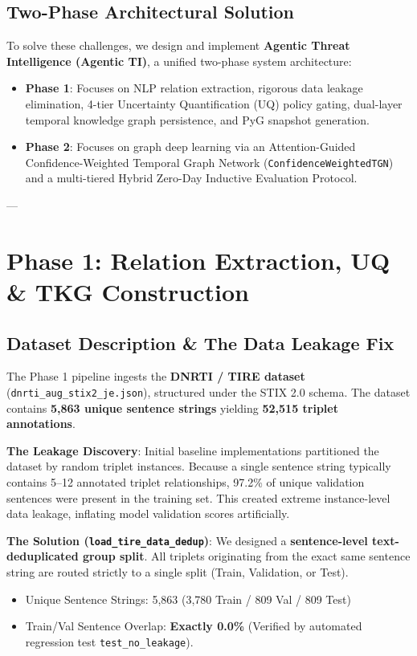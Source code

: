 \documentclass[11pt,a4paper]{article}
\begin{document}
\subsection{Two-Phase Architectural Solution}
To solve these challenges, we design and implement \textbf{Agentic Threat Intelligence (Agentic TI)}, a unified two-phase system architecture:
\begin{itemize}
    \item \textbf{Phase 1}: Focuses on NLP relation extraction, rigorous data leakage elimination, 4-tier Uncertainty Quantification (UQ) policy gating, dual-layer temporal knowledge graph persistence, and PyG snapshot generation.
    \item \textbf{Phase 2}: Focuses on graph deep learning via an Attention-Guided Confidence-Weighted Temporal Graph Network (\texttt{ConfidenceWeightedTGN}) and a multi-tiered Hybrid Zero-Day Inductive Evaluation Protocol.
\end{itemize}

---

\section{Phase 1: Relation Extraction, UQ \& TKG Construction}

\subsection{Dataset Description \& The Data Leakage Fix}
The Phase 1 pipeline ingests the \textbf{DNRTI / TIRE dataset} (\texttt{dnrti\_aug\_stix2\_je.json}), structured under the STIX 2.0 schema. The dataset contains \textbf{5,863 unique sentence strings} yielding \textbf{52,515 triplet annotations}.

\begin{tcolorbox}[colframe=accent, title=Critical Scientific Breakthrough: 97.2\% Data Leakage Elimination]
\textbf{The Leakage Discovery}: Initial baseline implementations partitioned the dataset by random triplet instances. Because a single sentence string typically contains 5–12 annotated triplet relationships, 97.2\% of unique validation sentences were present in the training set. This created extreme instance-level data leakage, inflating model validation scores artificially.

\textbf{The Solution (\texttt{load\_tire\_data\_dedup})}: We designed a \textbf{sentence-level text-deduplicated group split}. All triplets originating from the exact same sentence string are routed strictly to a single split (Train, Validation, or Test).
\begin{itemize}
    \item Unique Sentence Strings: 5,863 (3,780 Train / 809 Val / 809 Test)
    \item Train/Val Sentence Overlap: \textbf{Exactly 0.0\%} (Verified by automated regression test \texttt{test\_no\_leakage}).
\end{itemize}
\end{tcolorbox}
\end{document}
